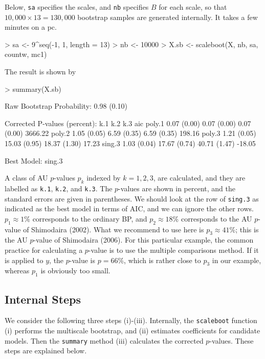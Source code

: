 \documentclass[a4paper]{amsart}
\begin{document}
Below, {\tt sa} specifies the scales, and {\tt nb} specifies
$B$ for each scale, so that $10,000\times13=130,000$ bootstrap samples
are generated internally.  It takes a few minutes on a pc.
\begin{Schunk}
\begin{Sinput}
> sa <- 9^seq(-1, 1, length = 13)
> nb <- 10000
> X.sb <- scaleboot(X, nb, sa, countw, mc1)
\end{Sinput}
\end{Schunk}
The result is shown by
\begin{Schunk}
\begin{Sinput}
> summary(X.sb)
\end{Sinput}
\begin{Soutput}
Raw Bootstrap Probability:  0.98 (0.10) 

Corrected P-values (percent):
       k.1         k.2          k.3          aic     
poly.1 0.07 (0.00)  0.07 (0.00)  0.07 (0.00) 3666.22 
poly.2 1.05 (0.05)  6.59 (0.35)  6.59 (0.35)  198.16 
poly.3 1.21 (0.05) 15.03 (0.95) 18.37 (1.30)   17.23 
sing.3 1.03 (0.04) 17.67 (0.74) 40.71 (1.47)  -18.05 

Best Model:  sing.3 
\end{Soutput}
\end{Schunk}

A class of AU $p$-values $p_k$ indexed by $k=1,2,3$, are calculated,
and they are labelled as {\tt k.1}, {\tt k.2}, and {\tt k.3}.  The
$p$-values are shown in percent, and the standard errors are given in
parentheses.  We should look at the row of {\tt sing.3} as indicated
as the best model in terms of AIC, and we can ignore the other
rows. $p_1\approx 1\%$ corresponds to the ordinary BP, and $p_2\approx
18\%$ corresponds to the AU $p$-value of Shimodaira (2002).  What we
recommend to use here is $p_3\approx41\%$; this is the AU $p$-value of
Shimodaira (2006).  For this particular example, the common practice
for calculating a $p$-value is to use the multiple comparisons
method. If it is applied to $y$, the $p$-value is $p=66\%$, which is
rather close to $p_3$ in our example, whereas $p_1$ is obviously too
small.

\subsection{Internal Steps}

We consider the following three steps (i)-(iii).
Internally, the {\tt scaleboot} function (i) performs the multiscale
bootstrap, and (ii) estimates coefficients for candidate models. Then
the {\tt summary} method (iii) calculates the corrected $p$-values.
These steps are explained below.
\end{document}
